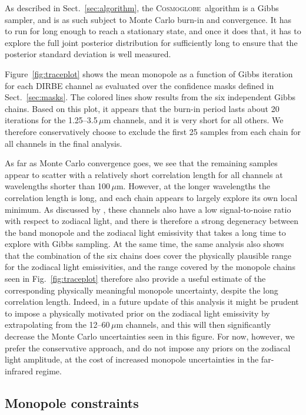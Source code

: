 \documentclass{aa}
\newcommand{\cosmoglobe}{\textsc{Cosmoglobe}}
\begin{document}
As described in Sect.~\ref{sec:algorithm}, the \cosmoglobe\ algorithm is a
Gibbs sampler, and is as such subject to Monte Carlo burn-in and
convergence. It has to run for long enough to reach a stationary
state, and once it does that, it has to explore the full joint
posterior distribution for sufficiently long to ensure that the
posterior standard deviation is well measured.


Figure~\ref{fig:traceplot} shows the mean monopole as a function of
Gibbs iteration for each DIRBE channel as evaluated over the
confidence masks defined in Sect.~\ref{sec:masks}. The colored lines
show results from the six independent Gibbs chains. Based on this
plot, it appears that the burn-in period lasts about 20\,iterations
for the 1.25--3.5$\,\mu\mathrm{m}$ channels, and it is very short for
all others. We therefore conservatively choose to exclude the first 25
samples from each chain for all channels in the final analysis.

As far as Monte Carlo convergence goes, we see that the remaining
samples appear to scatter with a relatively short correlation length
for all channels at wavelengths shorter than
100$\,\mu\mathrm{m}$. However, at the longer wavelengths the
correlation length is long, and each chain appears to largely explore
its own local minimum. As discussed by \citet{CG02_02}, these channels
also have a low signal-to-noise ratio with respect to zodiacal light,
and there is therefore a strong degeneracy between the band monopole
and the zodiacal light emissivity that takes a long time to explore
with Gibbs sampling. At the same time, the same analysis also shows
that the combination of the six chains does cover the physically
plausible range for the zodiacal light emissivities, and the range
covered by the monopole chains seen in Fig.~\ref{fig:traceplot}
therefore also provide a useful estimate of the corresponding
physically meaningful monopole uncertainty, despite the long
correlation length. Indeed, in a future update of this analysis it
might be prudent to impose a physically motivated prior on the
zodiacal light emissivity by extrapolating from the
12--60\,$\mu\mathrm{m}$ channels, and this will then significantly
decrease the Monte Carlo uncertainties seen in this figure. For now,
however, we prefer the conservative approach, and do not impose any
priors on the zodiacal light amplitude, at the cost of increased
monopole uncertainties in the far-infrared regime.

\subsection{Monopole constraints}
\end{document}
